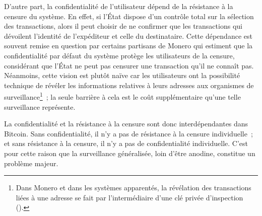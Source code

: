D'autre part, la confidentialité de l'utilisateur dépend de la résistance à la censure du système. En effet, si l'État dispose d'un contrôle total sur la sélection des transactions, alors il peut choisir de ne confirmer que les transactions qui dévoilent l'identité de l'expéditeur et celle du destinataire. Cette dépendance est souvent remise en question par certains partisans de Monero qui estiment que la confidentialité par défaut du système protège les utilisateurs de la censure, considérant que l'État ne peut pas censurer une transaction qu'il ne connaît pas. Néanmoins, cette vision est plutôt naïve car les utilisateurs ont la possibilité technique de révéler les informations relatives à leurs adresses aux organismes de surveillance\footnote{Dans Monero et dans les systèmes apparentés, la révélation des transactions liées à une adresse se fait par l'intermédiaire d'une clé privée d'inspection ().}~; la seule barrière à cela est le coût supplémentaire qu'une telle surveillance représente. %

La confidentialité et la résistance à la censure sont donc interdépendantes dans Bitcoin. Sans confidentialité, il n'y a pas de résistance à la censure individuelle~; et sans résistance à la censure, il n'y a pas de confidentialité individuelle. C'est pour cette raison que la surveillance généralisée, loin d'être anodine, constitue un problème majeur.


